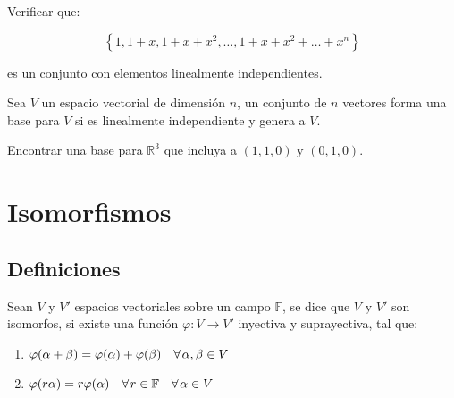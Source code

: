 		\begin{ejercicio}
			Verificar que:

			\begin{equation*}
				\left\{ 1, 1 + x, 1 + x + x^2, \dots, 1 + x + x^2 + \dots + x^n \right\}
			\end{equation*}

			es un conjunto con elementos linealmente independientes.
		\end{ejercicio}

		\begin{definicion}
			Sea $V$ un espacio vectorial de dimensión $n$, un conjunto de $n$ vectores forma una base para $V$ si es linealmente independiente y genera a $V$.
		\end{definicion}

		\begin{ejercicio}
			Encontrar una base para $\mathbb{R}^3$ que incluya a $(1, 1, 0)$ y $(0, 1, 0)$.
		\end{ejercicio}


\section{Isomorfismos}

	\subsection{Definiciones}

		\begin{definicion}
			Sean $V$ y $V'$ espacios vectoriales sobre un campo $\mathbb{F}$, se dice que $V$ y $V'$ son isomorfos, si existe una función $\varphi \colon V \to V'$ inyectiva y suprayectiva, tal que:

			\begin{enumerate}
				\item $\varphi(\alpha + \beta) = \varphi(\alpha) + \varphi(\beta) \quad \forall \mkern2mu \alpha, \beta \in V$
				\item $\varphi(r \alpha) = r \varphi(\alpha) \quad \forall \mkern2mu r \in \mathbb{F} \quad \forall \mkern2mu \alpha \in V$
			\end{enumerate}
		\end{definicion}


